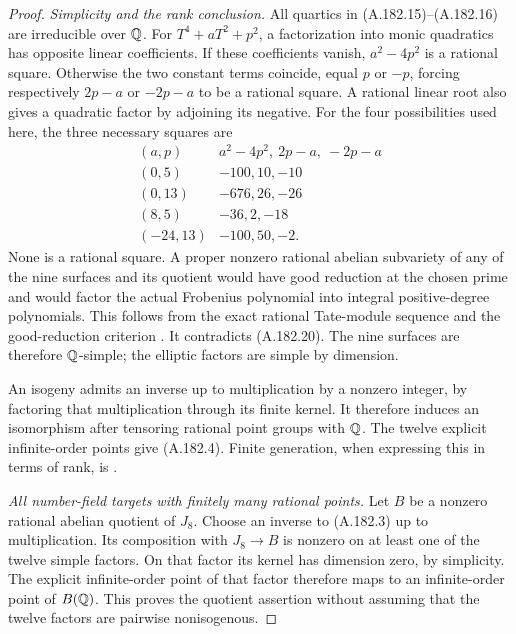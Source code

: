 \begin{proof}
\emph{Simplicity and the rank conclusion.}
All quartics in (A.182.15)--(A.182.16) are irreducible over
\(\mathbb Q\).  For \(T^4+aT^2+p^2\), a factorization into
monic quadratics has opposite linear coefficients.  If these
coefficients vanish, \(a^2-4p^2\) is a rational square.
Otherwise the two constant terms coincide, equal \(p\) or
\(-p\), forcing respectively \(2p-a\) or \(-2p-a\)
to be a rational square.  A rational linear root also gives
a quadratic factor by adjoining its negative.  For the
four possibilities used here, the three necessary squares are
\[
\begin{array}{c|c}
(a,p)&a^2-4p^2,\ 2p-a,\ -2p-a\\ \hline
(0,5)&-100,10,-10\\
(0,13)&-676,26,-26\\
(8,5)&-36,2,-18\\
(-24,13)&-100,50,-2.
\end{array}
\tag{A.182.20}
\]
None is a rational square.  A proper nonzero rational abelian
subvariety of any of the nine surfaces and its quotient would
have good reduction at the chosen prime and would factor the
actual Frobenius polynomial into integral positive-degree
polynomials.  This follows from the exact rational Tate-module
sequence and the good-reduction criterion
\cite[IV, Theorem 3.5 and Corollary 3.6]{LegMilneAV2008}.
It contradicts (A.182.20).  The nine surfaces are therefore
\(\mathbb Q\)-simple; the elliptic factors are simple by dimension.

An isogeny admits an inverse up to multiplication by a nonzero
integer, by factoring that multiplication through its finite
kernel.  It therefore induces an isomorphism after tensoring
rational point groups with \(\mathbb Q\).  The twelve explicit
infinite-order points give (A.182.4).  Finite generation, when
expressing this in terms of rank, is
\cite[I, Theorem 16.7]{LegMilneAV2008}.

\emph{All number-field targets with finitely many rational points.}
Let \(B\) be a nonzero rational abelian quotient of \(J_8\).
Choose an inverse to (A.182.3) up to multiplication.  Its
composition with \(J_8\to B\) is nonzero on at least one
of the twelve simple factors.  On that factor its kernel has
dimension zero, by simplicity.  The explicit infinite-order
point of that factor therefore maps to an infinite-order
point of \(B(\mathbb Q)\).  This proves the quotient assertion
without assuming that the twelve factors are pairwise
nonisogenous.


\end{proof}
